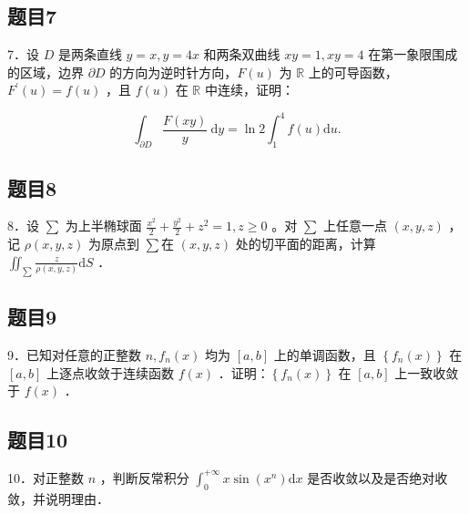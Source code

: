 \documentclass{article}
\begin{document}
\subsection{题目7}
7．设 \(D\) 是两条直线 \(y=x, y=4 x\) 和两条双曲线 \(x y=1, x y=4\) 在第一象限围成的区域，边界 \(\partial D\) 的方向为逆时针方向，\(F(u)\) 为 \(\mathbb{R}\) 上的可导函数，\(F^{\prime}(u)=f(u)\) ，且 \(f(u)\) 在 \(\mathbb{R}\) 中连续，证明：

\[
\int_{\partial D} \frac{F(x y)}{y} \mathrm{~d} y=\ln 2 \int_{1}^{4} f(u) \mathrm{d} u .
\]

\subsection{题目8}
8．设 \(\sum\) 为上半椭球面 \(\frac{x^{2}}{2}+\frac{y^{2}}{2}+z^{2}=1, z \geq 0\) 。对 \(\sum\) 上任意一点 \((x, y, z)\) ，记 \(\rho(x, y, z)\) 为原点到 \(\sum\)在 \((x, y, z)\) 处的切平面的距离，计算 \(\iint_{\sum} \frac{z}{\rho(x, y, z)} \mathrm{d} S\) ．

\subsection{题目9}
9．已知对任意的正整数 \(n, f_{n}(x)\) 均为 \([a, b]\) 上的单调函数，且 \(\left\{f_{n}(x)\right\}\) 在 \([a, b]\) 上逐点收敛于连续函数 \(f(x)\) ．证明：\(\left\{f_{n}(x)\right\}\) 在 \([a, b]\) 上一致收敛于 \(f(x)\) ．

\subsection{题目10}
10．对正整数 \(n\) ，判断反常积分 \(\int_{0}^{+\infty} x \sin \left(x^{n}\right) \mathrm{d} x\) 是否收敛以及是否绝对收敛，并说明理由．
\end{document}
